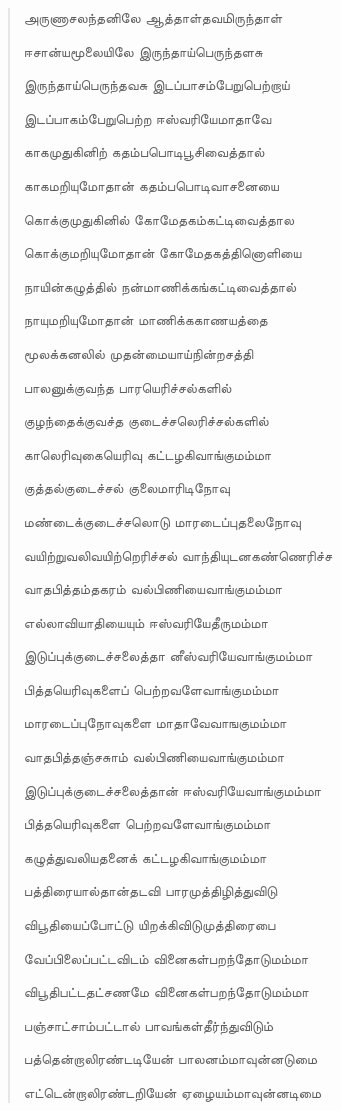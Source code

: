 \documentclass{article}
\begin{document}
\begin{quotation}
{அருணாசலந்தனிலே ஆத்தாள்தவமிருந்தாள்

ஈசான்யமூலையிலே இருந்தாய்பெருந்தளசு

இருந்தாய்பெருந்தவசு இடப்பாசம்பேறுபெற்றாய்

இடப்பாகம்பேறுபெற்ற ஈஸ்வரியேமாதாவே

காகமுதுகினிற் கதம்பபொடிபூசிவைத்தால்

காகமறியுமோதான் கதம்பபொடிவாசனையை

கொக்குமுதுகினில் கோமேதகம்கட்டிவைத்தால

கொக்குமறியுமோதான் கோமேதகத்தினொளியை

நாயின்கழுத்தில்‌ நன்மாணிக்கங்கட்டிவைத்தால்‌

நாயுமறியுமோதான்‌ மாணிக்ககாணயத்தை

மூலக்கனலில் முதன்மையாய்நின்றசத்தி

பாலனுக்குவந்த பாரயெரிச்சல்களில்

குழந்தைக்குவச்த குடைச்சலெரிச்சல்களில்‌

காலெரிவுகையெரிவு கட்டழகிவாங்குமம்மா

குத்தல்குடைச்சல் குலைமாரிடிநோவு

மண்டைக்குடைச்சலொடு மாரடைப்புதலைநோவு

வயிற்றுவலிவயிற்றெரிச்சல்‌ வாந்தியுடனகண்ணெரிச்ச

வாதபித்தம்‌தகரம்‌ வல்பிணியைவாங்குமம்மா

எல்லாவியாதியையும்‌ ஈஸ்வரியேதீருமம்மா

இடுப்புக்குடைச்சலைத்தா னீஸ்வரியேவாங்குமம்மா

பித்தயெரிவுகளைப் பெற்றவளேவாங்குமம்மா

மாரடைப்புநோவுகளை மாதாவேவாஙகுமம்மா

வாதபித்தஞ்சசுாம்‌ வல்பிணியைவாங்குமம்மா

இடுப்புக்குடைச்சலைத்தான்‌ ஈஸ்வரியேவாங்குமம்மா

பித்தயெரிவுகளை பெற்றவளேவாங்குமம்மா

கழுத்துவலியதனைக் கட்டழகிவாங்குமம்மா

பத்திரையால்தான்தடவி பாரமுத்திழித்துவிடு

விபூதியைப்போட்டு யிறக்கிவிடுமுத்திரைபை

வேப்பிலைப்பட்டவிடம் வினைகள்பறந்தோடுமம்மா

விபூதிபட்டதட்சணமே வினைகள்பறந்தோடுமம்மா

பஞ்சாட்சாம்பட்டால் பாவங்கள்தீர்ந்துவிடும்

பத்தென்றாலிரண்டடியேன் பாலனம்மாவுன்னடுமை

எட்டென்றாலிரண்டறியேன் ஏழையம்மாவுன்னடிமை

}
\end{quotation}
\end{document}

